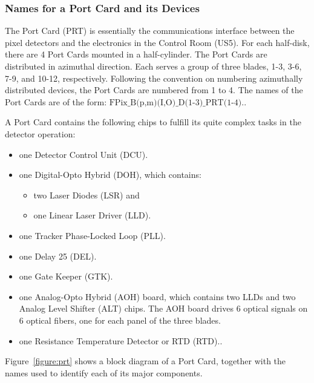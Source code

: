 \documentclass{cmspaper}
\begin{document}
\subsubsection{Names for a  Port Card and its Devices}

The Port Card (PRT) is essentially the communications interface between the  
pixel detectors and the electronics in the Control Room (US5). 
For each half-disk, there are 4 Port Cards mounted in a half-cylinder.
The Port Cards are distributed in azimuthal direction.
Each serves a group of three blades, 1-3, 3-6, 7-9, and 10-12, respectively. 
Following the convention on numbering azimuthally distributed devices, 
the Port Cards are numbered from 1 to 4. 
The names of the Port Cards are of the form:
$\mbox{FPix\_B(p,m)(I,O)\_D(1-3)\_PRT(1-4).}$. 

A Port Card contains the following chips to fulfill its quite complex tasks 
in the detector operation:
\begin{itemize}
\item one Detector Control Unit (DCU). 
\item one Digital-Opto Hybrid (DOH), which contains: 
\begin{itemize}
\item two Laser Diodes (LSR) and 
\item one Linear Laser Driver (LLD).
\end{itemize}
\item one Tracker Phase-Locked Loop (PLL). 
\item one Delay 25 (DEL). 
\item one Gate Keeper (GTK).
\item one Analog-Opto Hybrid (AOH) board, which contains two LLDs and two 
Analog Level Shifter (ALT) chips. The AOH board drives 6 optical signals 
on 6 optical fibers, one for each panel of the three blades.
\item one Resistance Temperature Detector or  RTD (RTD).. 
\end{itemize}

Figure~\ref{figure:prt} shows a block diagram of a Port Card,
together with the names used to identify each of its major components. 
\end{document}
